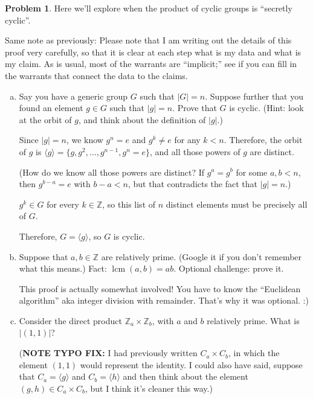 \documentclass[12pt]{article}
\theoremstyle{definition} %
\newtheorem{problem}{Problem}
\newcommand{\Alert}[1]{\textcolor{xRed}{#1}}
\newcommand{\Z}{\mathbb{Z}}
\def\<{\langle}
\def\>{\rangle}
\DeclareMathOperator{\lcm}{lcm}
\newenvironment{red}{\color{red}}{\ignorespacesafterend}
\begin{document}
\begin{problem}
    Here we'll explore when the product of cyclic groups is ``secretly cyclic''.

    \begin{red}
        Same note as previously: Please note that I am writing out the details of this proof very carefully, so that it is clear at each step what is my data and what is my claim. As is usual, most of the warrants are ``implicit;'' see if you can fill in the warrants that connect the data to the claims.
    \end{red}
    \begin{enumerate}[(a)]
        \item Say you have a generic group $G$ such that $|G| = n$. Suppose further that you found an element $g\in G$ such that $|g| = n$. Prove that $G$ is cyclic. (Hint: look at the orbit of $g$, and think about the definition of $|g|$.)

        \begin{red}
            Since $|g| = n$, we know $g^n = e$ and $g^k \neq e$ for any $k < n$. Therefore, the orbit of $g$ is $\<g\> = \{g, g^2, \ldots, g^{n-1}, g^n = e \}$, and all those powers of $g$ are distinct.

            (How do we know all those powers are distinct? If $g^a = g^b$ for some $a, b < n$, then $g^{b-a} = e$ with $b-a<n$, but that contradicts the fact that $|g| = n$.)

            $g^k \in G$ for every $k\in \Z$, so this list of $n$ distinct elements must be precisely all of $G$. 

            Therefore, $G = \<g\>$, so $G$ is cyclic.
        \end{red}

        \item Suppose that $a, b \in \Z$ are relatively prime. (Google it if you don't remember what this means.) Fact: $\lcm(a, b) = ab.$ Optional challenge: prove it.

        \begin{red}
            This proof is actually somewhat involved! You have to know the ``Euclidean algorithm'' aka integer division with remainder. That's why it was optional. :)
        \end{red}

        \item Consider the direct product $\Z_a \times \Z_b$, with $a$ and $b$ relatively prime. What is $|(1,1)|$?

        (\textbf{\Alert{NOTE TYPO FIX:}} I had previously written $C_a \times C_b$, in which the element $(1,1)$ would represent the identity. I could also have said, suppose that $C_a = \<g\>$ and $C_b = \<h\>$ and then think about the element $(g, h)\in C_a \times C_b$, but I think it's cleaner this way.)


\end{enumerate}
\end{problem}
\end{document}
